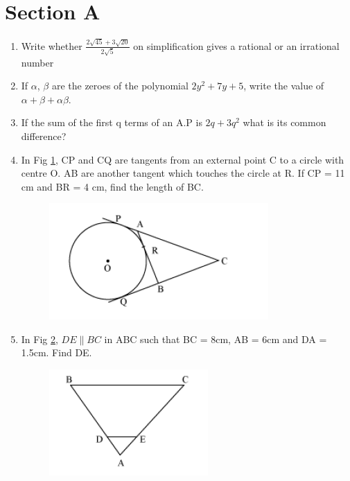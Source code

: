 \documentclass[journal,12pt,twocolumn]{IEEEtran}
\renewcommand\thesection{\arabic{section}}
\begin{document}
\section{Section A}
\renewcommand{\theequation}{\theenumi}
\begin{enumerate}[label=\thesection.\arabic*.,ref=\thesection.\theenumi]
\item Write whether $\frac{2\sqrt{45}+3\sqrt{20}}{2\sqrt{5}}$ on simplification gives a rational or an irrational number\\
\item If $\alpha$, $\beta$ are the zeroes of the polynomial $2y^2+7y+5$, write the value of $\alpha+\beta+\alpha\beta$. \\
\item If the sum of the first q terms of an A.P is $2q+3q^2$ what is its common difference? \\
\item In Fig \ref{fig1}, CP and CQ are tangents from an external point C to a circle with centre O. AB are another tangent which touches the circle at R. If CP = 11 cm and BR = 4 cm, find the length of BC.
\begin{figure}[h!]
    \centering
    \includegraphics[width=0.5\columnwidth,center]{./fig/1.png}
	\caption{}
	\label{fig1}
 \end{figure} 
\item In Fig \ref{fig2}, $DE \parallel BC$ in ABC such that BC = 8cm, AB = 6cm and DA = 1.5cm. Find DE.
\begin{figure}[h!]
    \centering
    \includegraphics[width=0.5\columnwidth,center]{./fig/2.png}
	\caption{}
	\label{fig2}
 \end{figure} 

\end{enumerate}
\end{document}
